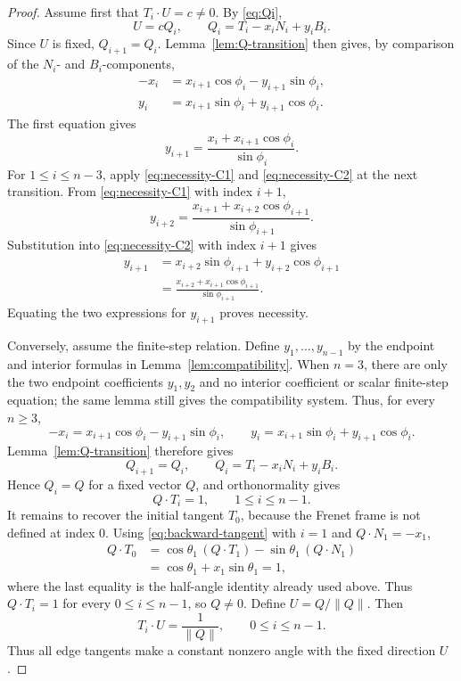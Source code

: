 \documentclass[10pt,a4paper]{amsart}
\theoremstyle{definition}
\theoremstyle{remark}
\numberwithin{equation}{section}
\begin{document}
\begin{proof}
Assume first that \(T_i\cdot U=c\neq0\). By \eqref{eq:Qi},
\[
U=cQ_i,\qquad Q_i=T_i-x_iN_i+y_iB_i.
\]
Since \(U\) is fixed, \(Q_{i+1}=Q_i\). Lemma~\ref{lem:Q-transition} then gives, by comparison of the $N_i$- and $B_i$-components,
\begin{align}
-x_i&=x_{i+1}\cos\phi_i-y_{i+1}\sin\phi_i,\label{eq:necessity-C1}\\
y_i&=x_{i+1}\sin\phi_i+y_{i+1}\cos\phi_i.\label{eq:necessity-C2}
\end{align}
The first equation gives
\[
y_{i+1}
=
\frac{x_i+x_{i+1}\cos\phi_i}{\sin\phi_i}.
\]
For $1\le i\le n-3$, apply \eqref{eq:necessity-C1} and \eqref{eq:necessity-C2} at the next transition.  From \eqref{eq:necessity-C1} with index $i+1$,
\[
y_{i+2}=\frac{x_{i+1}+x_{i+2}\cos\phi_{i+1}}{\sin\phi_{i+1}}.
\]
Substitution into \eqref{eq:necessity-C2} with index $i+1$ gives
\begin{align*}
y_{i+1}
&=x_{i+2}\sin\phi_{i+1}+y_{i+2}\cos\phi_{i+1}\\
&=\frac{x_{i+2}+x_{i+1}\cos\phi_{i+1}}{\sin\phi_{i+1}}.
\end{align*}
Equating the two expressions for $y_{i+1}$ proves necessity.

Conversely, assume the finite-step relation. Define $y_1,\ldots,y_{n-1}$ by the endpoint and interior formulas in Lemma~\ref{lem:compatibility}. When $n=3$, there are only the two endpoint coefficients $y_1,y_2$ and no interior coefficient or scalar finite-step equation; the same lemma still gives the compatibility system. Thus, for every $n\ge3$,
\[
-x_i=x_{i+1}\cos\phi_i-y_{i+1}\sin\phi_i,
\qquad
y_i=x_{i+1}\sin\phi_i+y_{i+1}\cos\phi_i.
\]
Lemma~\ref{lem:Q-transition} therefore gives
\[
Q_{i+1}=Q_i,
\qquad
Q_i=T_i-x_iN_i+y_iB_i.
\]
Hence \(Q_i=Q\) for a fixed vector \(Q\), and orthonormality gives
\[
Q\cdot T_i=1,\qquad 1\le i\le n-1.
\]
It remains to recover the initial tangent $T_0$, because the Frenet frame is not defined at index $0$.  Using \eqref{eq:backward-tangent} with $i=1$ and $Q\cdot N_1=-x_1$,
\begin{align*}
Q\cdot T_0
&=\cos\theta_1\,(Q\cdot T_1)-\sin\theta_1\,(Q\cdot N_1)\\
&=\cos\theta_1+x_1\sin\theta_1=1,
\end{align*}
where the last equality is the half-angle identity already used above.  Thus $Q\cdot T_i=1$ for every $0\le i\le n-1$, so \(Q\neq0\). Define \(U=Q/\|Q\|\). Then
\[
T_i\cdot U=\frac1{\|Q\|},\qquad 0\le i\le n-1.
\]
Thus all edge tangents make a constant nonzero angle with the fixed direction \(U\).
\end{proof}
\end{document}
